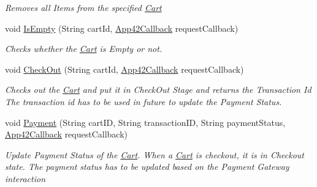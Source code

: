 \begin{DoxyCompactItemize}
\begin{DoxyCompactList}\small\item\em Removes all Items from the specified \hyperlink{classcom_1_1shephertz_1_1app42_1_1paas_1_1sdk_1_1windows_1_1shopping_1_1_cart}{Cart} \end{DoxyCompactList}\item 
void \hyperlink{classcom_1_1shephertz_1_1app42_1_1paas_1_1sdk_1_1windows_1_1shopping_1_1_cart_service_a1fe69c8d68805b327c832daa3cbb23fb}{Is\+Empty} (String cart\+Id, \hyperlink{interfacecom_1_1shephertz_1_1app42_1_1paas_1_1sdk_1_1windows_1_1_app42_callback}{App42\+Callback} request\+Callback)
\begin{DoxyCompactList}\small\item\em Checks whether the \hyperlink{classcom_1_1shephertz_1_1app42_1_1paas_1_1sdk_1_1windows_1_1shopping_1_1_cart}{Cart} is Empty or not. \end{DoxyCompactList}\item 
void \hyperlink{classcom_1_1shephertz_1_1app42_1_1paas_1_1sdk_1_1windows_1_1shopping_1_1_cart_service_a5775112ec3b9fadd7b4d648f1ade99a5}{Check\+Out} (String cart\+Id, \hyperlink{interfacecom_1_1shephertz_1_1app42_1_1paas_1_1sdk_1_1windows_1_1_app42_callback}{App42\+Callback} request\+Callback)
\begin{DoxyCompactList}\small\item\em Checks out the \hyperlink{classcom_1_1shephertz_1_1app42_1_1paas_1_1sdk_1_1windows_1_1shopping_1_1_cart}{Cart} and put it in Check\+Out Stage and returns the Transaction Id The transaction id has to be used in future to update the Payment Status. \end{DoxyCompactList}\item 
void \hyperlink{classcom_1_1shephertz_1_1app42_1_1paas_1_1sdk_1_1windows_1_1shopping_1_1_cart_service_a09b04ce8b41caa3da63c623269f1da4b}{Payment} (String cart\+I\+D, String transaction\+I\+D, String payment\+Status, \hyperlink{interfacecom_1_1shephertz_1_1app42_1_1paas_1_1sdk_1_1windows_1_1_app42_callback}{App42\+Callback} request\+Callback)
\begin{DoxyCompactList}\small\item\em Update Payment Status of the \hyperlink{classcom_1_1shephertz_1_1app42_1_1paas_1_1sdk_1_1windows_1_1shopping_1_1_cart}{Cart}. When a \hyperlink{classcom_1_1shephertz_1_1app42_1_1paas_1_1sdk_1_1windows_1_1shopping_1_1_cart}{Cart} is checkout, it is in Checkout state. The payment status has to be updated based on the Payment Gateway interaction \end{DoxyCompactList}\item 

\end{DoxyCompactItemize}
